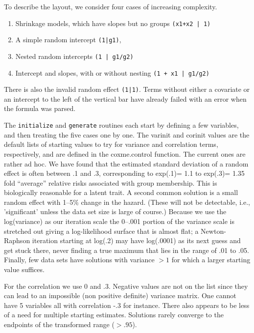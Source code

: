 \documentclass{article}
\begin{document}
To describe the layout, we consider four cases of increasing complexity.
\begin{enumerate}
  \item Shrinkage models, which have slopes but no groups \Verb!(x1+x2 | 1)!
  \item A simple random intercept \Verb!(1|g1)!, 
  \item Nested random intercepts \Verb!(1 | g1/g2)!
  \item Intercept and slopes, with or without nesting \Verb!(1 + x1 | g1/g2)!
\end{enumerate}
There is also the invalid random effect \Verb!(1|1)!. 
Terms without either
a covariate or an intercept to the left of the vertical bar have already
failed with an error when the formula was parsed.

The \Verb!initialize! and \Verb?generate? routines each start by
defining a few variables, and then treating the five cases one by one.
The varinit and corinit values are the default lists of starting values
to try for variance and correlation terms, respectively,
and are defined in the coxme.control function.
The current ones are rather ad hoc. We have found that the estimated standard
deviation of a random effect is often between .1 and .3, corresponding to
exp(.1)= 1.1 to exp(.3)= 1.35 fold ``average'' relative risks associated with
group membership.  This is  biologically reasonable for a latent trait.
A second common solution is a small random effect with 1--5\% change in the hazard.  
(These will not be detectable, i.e., 'significant' unless the data set size is
large of course.)
Because we use the log(variance) as our iteration scale the 0--.001 portion of the
variance scale is stretched out giving a log-likelihood surface that is almost
flat; a Newton-Raphson iteration starting at log(.2) may have log(.0001) as its
next guess and get stuck there, never finding a true maximum that lies in the
range of .01 to .05. 
Finally, few data sets have solutions with variance $>1$ for which a larger
starting value suffices.

For the correlation we use 0 and .3.  Negative values are not on the list since
they can lead to an impossible (non positive definite) variance matrix.
One cannot have 5 variables all with correlation -.3 for instance.  
There also appears to be less of a need for multiple starting estimates.  Solutions
rarely converge to the endpoints of the transformed range ($> .95$).
\end{document}
